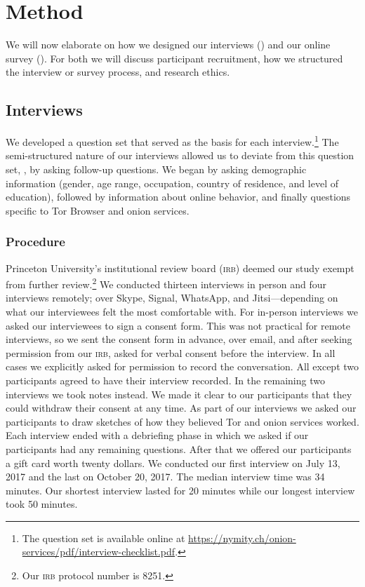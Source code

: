 \section{Method}
\label{sec:method}

We will now elaborate on how we designed our interviews
() and our online survey
().  For both we will discuss participant
recruitment, how we structured the interview or survey process, and research
ethics.

\subsection{Interviews}
\label{sec:interviews}

We developed a question set that served as the basis for each
interview.\footnote{The question set is available online at
\url{https://nymity.ch/onion-services/pdf/interview-checklist.pdf}.}  The
semi-structured nature of our interviews allowed us to deviate from this
question set, \eg, by asking follow-up questions.  We began by asking
demographic information (gender, age range, occupation, country of residence,
and level of education), followed by information about online behavior, and
finally questions specific to Tor Browser and onion services.

\subsubsection{Procedure}

Princeton University's institutional review board (\textsc{irb}) deemed our
study exempt from further review.\footnote{Our \textsc{irb} protocol number is
8251.}  We conducted thirteen interviews in person and four interviews remotely;
over Skype, Signal, WhatsApp, and Jitsi---depending on what our interviewees
felt the most comfortable with.  For in-person interviews we asked our
interviewees to sign a consent form.  This was not practical for remote
interviews, so we sent the consent form in advance, over email, and after
seeking permission from our \textsc{irb}, asked for verbal consent before the
interview.  In all cases we explicitly asked for permission to record the
conversation.  All except two participants agreed to have their interview
recorded.  In the remaining two interviews we took notes instead.  We made it
clear to our participants that they could withdraw their consent at any time.
As part of our interviews we asked our participants to draw sketches of how they
believed Tor and onion services worked.  Each interview ended with a debriefing
phase in which we asked if our participants had any remaining questions.  After
that we offered our participants a gift card worth twenty dollars.  We conducted
our first interview on July 13, 2017 and the last on October 20, 2017.  The
median interview time was 34 minutes.  Our shortest interview lasted for 20
minutes while our longest interview took 50 minutes.

